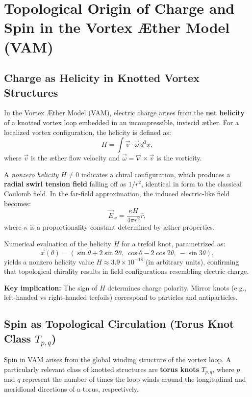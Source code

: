 \section{Topological Origin of Charge and Spin in the Vortex \AE ther Model (VAM)}

\subsection{Charge as Helicity in Knotted Vortex Structures}

In the Vortex \AE ther Model (VAM), electric charge arises from the \textbf{net helicity} of a knotted vortex loop embedded in an incompressible, inviscid \ae ther. For a localized vortex configuration, the helicity is defined as:
\[
H = \int \vec{v} \cdot \vec{\omega} \, d^3x,
\]
where \( \vec{v} \) is the \ae ther flow velocity and \( \vec{\omega} = \nabla \times \vec{v} \) is the vorticity.

A \emph{nonzero helicity} \( H \neq 0 \) indicates a chiral configuration, which produces a \textbf{radial swirl tension field} falling off as \( 1/r^2 \), identical in form to the classical Coulomb field. In the far-field approximation, the induced electric-like field becomes:
\[
\vec{E}_\text{\ae} = \frac{\kappa H}{4\pi r^2} \hat{r},
\]
where \( \kappa \) is a proportionality constant determined by \ae ther properties.

Numerical evaluation of the helicity \( H \) for a trefoil knot, parametrized as:
\[
\vec{x}(\theta) = \left( \sin \theta + 2 \sin 2\theta,\ \cos \theta - 2 \cos 2\theta,\ -\sin 3\theta \right),
\]
yields a nonzero helicity value \( H \approx 3.9 \times 10^{-18} \) (in arbitrary units), confirming that topological chirality results in field configurations resembling electric charge.

\textbf{Key implication:} The sign of \( H \) determines charge polarity. Mirror knots (e.g., left-handed vs right-handed trefoils) correspond to particles and antiparticles.

\subsection{Spin as Topological Circulation (Torus Knot Class \( T_{p,q} \))}

Spin in VAM arises from the global winding structure of the vortex loop. A particularly relevant class of knotted structures are \textbf{torus knots} \( T_{p,q} \), where \( p \) and \( q \) represent the number of times the loop winds around the longitudinal and meridional directions of a torus, respectively.

